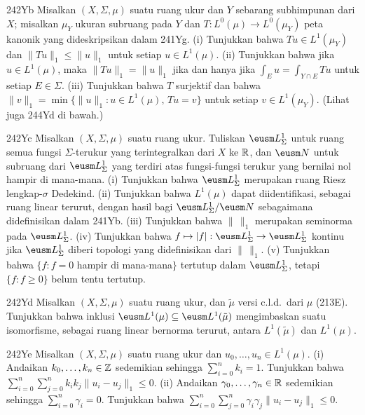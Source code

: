{\spheader 242Yb Misalkan $(X,\Sigma,\mu)$ suatu ruang ukur dan $Y$
sebarang subhimpunan dari $X$; misalkan $\mu_Y$ ukuran subruang pada $Y$
dan $T:L^0(\mu)\to L^0(\mu_Y)$ peta kanonik yang dideskripsikan dalam
241Yg. (i) Tunjukkan bahwa $Tu\in L^1(\mu_Y)$ dan
$\|Tu\|_1\le\|u\|_1$ untuk setiap $u\in L^1(\mu)$. (ii) Tunjukkan
bahwa jika $u\in L^1(\mu)$, maka $\|Tu\|_1=\|u\|_1$ jika dan hanya jika
$\int_Eu=\int_{Y\cap E}Tu$ untuk setiap $E\in\Sigma$. (iii) Tunjukkan
bahwa $T$ surjektif dan bahwa
$\|v\|_1=\min\{\|u\|_1:u\in L^1(\mu),\,Tu=v\}$ untuk setiap
$v\in L^1(\mu_Y)$.  (Lihat juga 244Yd di bawah.)

\spheader 242Yc Misalkan $(X,\Sigma,\mu)$ suatu ruang ukur. Tuliskan
$\eusm L^1_{\Sigma}$ untuk ruang semua fungsi $\Sigma$-terukur yang
terintegralkan dari $X$ ke $\Bbb R$, dan $\eusm N$ untuk subruang dari
$\eusm L^1_{\Sigma}$ yang terdiri atas fungsi-fungsi terukur yang bernilai
nol hampir di mana-mana. (i) Tunjukkan bahwa $\eusm L^1_{\Sigma}$
merupakan ruang Riesz lengkap-$\sigma$ Dedekind. (ii) Tunjukkan bahwa
$L^1(\mu)$ dapat diidentifikasi, sebagai ruang linear terurut, dengan hasil
bagi $\eusm L^1_{\Sigma}/\eusm N$ sebagaimana didefinisikan dalam 241Yb.
(iii) Tunjukkan bahwa $\|\,\|_1$ merupakan seminorma pada
$\eusm L^1_{\Sigma}$. (iv) Tunjukkan bahwa
$f\mapsto|f|:\eusm L^1_{\Sigma}\to\eusm L^1_{\Sigma}$ kontinu jika
$\eusm L^1_{\Sigma}$ diberi topologi yang didefinisikan dari
$\|\,\|_1$. (v) Tunjukkan bahwa $\{f:f=0$ hampir di mana-mana$\}$
tertutup dalam $\eusm L^1_{\Sigma}$, tetapi $\{f:f\ge 0\}$ belum tentu
tertutup.

\spheader 242Yd Misalkan $(X,\Sigma,\mu)$ suatu ruang ukur, dan
$\tilde\mu$ versi c.l.d.\ dari $\mu$ (213E). Tunjukkan bahwa inklusi
$\eusm L^1(\mu)\subseteq\eusm L^1(\tilde\mu)$ mengimbaskan suatu
isomorfisme, sebagai ruang linear bernorma terurut, antara
$L^1(\tilde\mu)$ dan $L^1(\mu)$.

\spheader 242Ye Misalkan $(X,\Sigma,\mu)$ suatu ruang ukur dan
$u_0,\ldots,u_n\in L^1(\mu)$. (i) Andaikan $k_0,\ldots,k_n\in\Bbb Z$
sedemikian sehingga $\sum_{i=0}^nk_i=1$. Tunjukkan bahwa
$\sum_{i=0}^n\sum_{j=0}^nk_ik_j\|u_i-u_j\|_1\le 0$.  (ii) Andaikan
$\gamma_0,\ldots,\gamma_n\in\Bbb R$ sedemikian sehingga
$\sum_{i=0}^n\gamma_i=0$. Tunjukkan bahwa
$\sum_{i=0}^n\sum_{j=0}^n\gamma_i\gamma_j\|u_i-u_j\|_1\le 0$.

}
